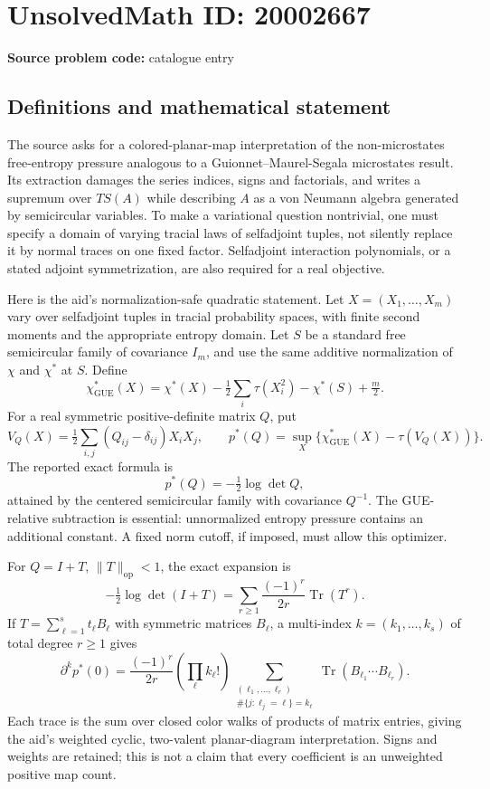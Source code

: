 \documentclass[11pt]{article}
\begin{document}
\section*{UnsolvedMath ID: 20002667}
\textbf{Source problem code:} catalogue entry
\subsection{Definitions and mathematical statement}
The source asks for a colored-planar-map interpretation of the non-microstates free-entropy pressure analogous to a Guionnet--Maurel-Segala microstates result. Its extraction damages the series indices, signs and factorials, and writes a supremum over $TS(A)$ while describing $A$ as a von Neumann algebra generated by semicircular variables. To make a variational question nontrivial, one must specify a domain of varying tracial laws of selfadjoint tuples, not silently replace it by normal traces on one fixed factor. Selfadjoint interaction polynomials, or a stated adjoint symmetrization, are also required for a real objective.

Here is the aid's normalization-safe quadratic statement. Let $X=(X_1,\ldots,X_m)$ vary over selfadjoint tuples in tracial probability spaces, with finite second moments and the appropriate entropy domain. Let $S$ be a standard free semicircular family of covariance $I_m$, and use the same additive normalization of $\chi$ and $\chi^*$ at $S$. Define
\[
 \chi^*_{\mathrm{GUE}}(X)
 =\chi^*(X)-\tfrac12\sum_i\tau(X_i^2)-\chi^*(S)+\tfrac m2.
\]
For a real symmetric positive-definite matrix $Q$, put
\[
 V_Q(X)=\tfrac12\sum_{i,j}(Q_{ij}-\delta_{ij})X_iX_j,
 \qquad p^*(Q)=\sup_X\{\chi^*_{\mathrm{GUE}}(X)-\tau(V_Q(X))\}.
\]
The reported exact formula is
\[
 p^*(Q)=-\tfrac12\log\det Q,
\]
attained by the centered semicircular family with covariance $Q^{-1}$. The GUE-relative subtraction is essential: unnormalized entropy pressure contains an additional constant. A fixed norm cutoff, if imposed, must allow this optimizer.

For $Q=I+T$, $\|T\|_{\mathrm{op}}<1$, the exact expansion is
\[
 -\tfrac12\log\det(I+T)
   =\sum_{r\ge1}\frac{(-1)^r}{2r}\operatorname{Tr}(T^r).
\]
If $T=\sum_{\ell=1}^s t_\ell B_\ell$ with symmetric matrices $B_\ell$, a multi-index $k=(k_1,\ldots,k_s)$ of total degree $r\ge1$ gives
\[
 \partial^kp^*(0)=\frac{(-1)^r}{2r}
    \left(\prod_\ell k_\ell!\right)
    \sum_{\substack{(\ell_1,\ldots,\ell_r)\\
                  \#\{j:\ell_j=\ell\}=k_\ell}}
       \operatorname{Tr}(B_{\ell_1}\cdots B_{\ell_r}).
\]
Each trace is the sum over closed color walks of products of matrix entries, giving the aid's weighted cyclic, two-valent planar-diagram interpretation. Signs and weights are retained; this is not a claim that every coefficient is an unweighted positive map count.
\end{document}
